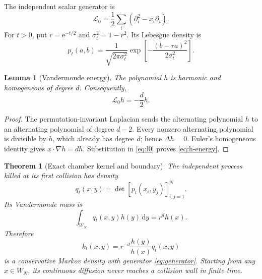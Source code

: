 \documentclass[10pt]{article}
\newcommand{\e}{\mathrm e}
\newcommand{\dd}{\,\mathrm d}
\newtheorem{theorem}{Theorem}
\newtheorem{lemma}{Lemma}
\begin{document}
The independent scalar generator is
\begin{equation}
 \mathcal L_0=\frac12\sum_i(\partial_i^2-x_i\partial_i).
                                                        \label{eq:l0}
\end{equation}
For $t>0$, put $r=\e^{-t/2}$ and $\sigma_t^2=1-r^2$.  Its Lebesgue density is
\begin{equation}
 p_t(a,b)=\frac1{\sqrt{2\pi\sigma_t^2}}
 \exp[-\frac{(b-ra)^2}{2\sigma_t^2}].                 \label{eq:mehler}
\end{equation}

\begin{lemma}[Vandermonde energy]
The polynomial $h$ is harmonic and homogeneous of degree $d$.  Consequently,
\begin{equation}
 \mathcal L_0h=-\frac d2h.                             \label{eq:h-energy}
\end{equation}
\end{lemma}

\begin{proof}
The permutation-invariant Laplacian sends the alternating polynomial $h$ to
an alternating polynomial of degree $d-2$.  Every nonzero alternating
polynomial is divisible by $h$, which already has degree $d$; hence
$\Delta h=0$.  Euler's homogeneous identity gives $x\cdot\nabla h=dh$.
Substitution in \eqref{eq:l0} proves \eqref{eq:h-energy}.
\end{proof}

\begin{theorem}[Exact chamber kernel and boundary]
The independent process killed at its first collision has density
\begin{equation}
 q_t(x,y)=\det[p_t(x_i,y_j)]_{i,j=1}^N.                \label{eq:km}
\end{equation}
Its Vandermonde mass is
\begin{equation}
 \int_{W_N}q_t(x,y)h(y)\dd y=r^dh(x).                 \label{eq:h-mass}
\end{equation}
Therefore
\begin{equation}
 k_t(x,y)=r^{-d}\frac{h(y)}{h(x)}q_t(x,y)              \label{eq:doob}
\end{equation}
is a conservative Markov density with generator \eqref{eq:generator}.
Starting from any $x\in W_N$, its continuous diffusion never reaches a
collision wall in finite time.
\end{theorem}
\end{document}
